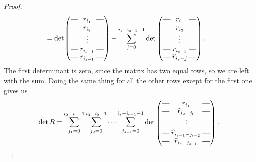 \begin{proof}
\begin{align*}
            &=   \det\begin{pmatrix}
              \matrow{r_{i_1}} \\
              \matrow{r_{i_2}} \\
              & \hspace{-0.75em} \vdots & \\
              \matrow{r_{i_{s-1}}} \\
              \matrow{r_{i_{s-1}}}
            \end{pmatrix}
    + \sum_{j=0}^{i_s-i_{s-1}-1} \det\begin{pmatrix}
      \matrow{r_{i_1}} \\
      \matrow{r_{i_2}} \\
      & \hspace{-0.75em} \vdots & \\
      \matrow{r_{i_{s-1}}} \\
      \matrow{\widehat{r}_{i_s-j}} \end{pmatrix}.
  \end{align*}
  The first determinant is zero, since the matrix has two equal rows,
  so we are left with the sum. Doing the same thing for all the other
  rows except for the first one gives us
  \[ \det R = \sum_{j_1 = 0}^{i_2-i_1-1}\sum_{j_2 = 0}^{i_3-i_2-1}
  \dots \sum_{j_{s-1}=0}^{i_s-i_{s-1}-1} \det
  \begin{pmatrix}
    \matrow{r_{i_1}} \\
    \matrow{\widehat{r}_{i_2-j_1}} \\
    & \hspace{-0.75em} \vdots & \\
    \matrow{\widehat{r}_{i_{s-1}-j_{s-2}}} \\
    \matrow{\widehat{r}_{i_s-j_{s-1}}}
  \end{pmatrix}. \]


\end{proof}
